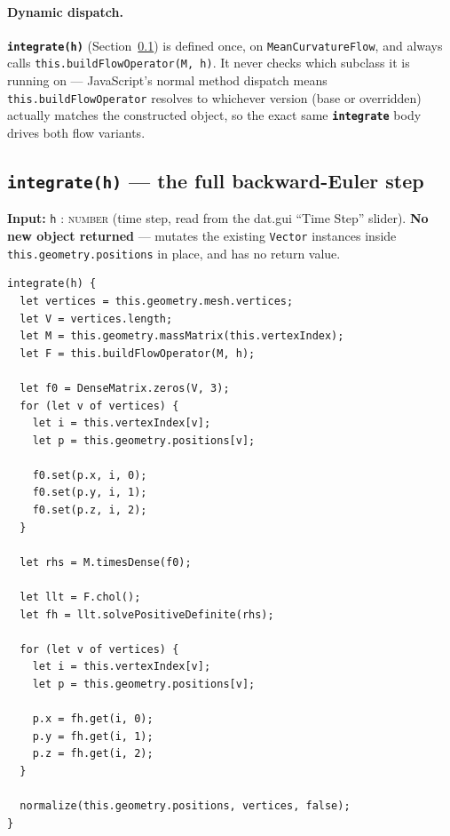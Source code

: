 \documentclass[11pt]{article}
\newcommand{\code}[1]{\texttt{#1}}
\newcommand{\func}[1]{\texttt{\textbf{#1}}}
\newcommand{\type}[1]{\textsc{#1}}
\begin{document}
\paragraph{Dynamic dispatch.} \func{integrate(h)} (Section~\ref{sec:integrate}) is defined
once, on \code{MeanCurvatureFlow}, and always calls \code{this.buildFlowOperator(M, h)}. It
never checks which subclass it is running on --- JavaScript's normal method dispatch means
\code{this.buildFlowOperator} resolves to whichever version (base or overridden) actually
matches the constructed object, so the exact same \func{integrate} body drives both flow
variants.

\subsection{\func{integrate(h)} --- the full backward-Euler step}
\label{sec:integrate}
\textbf{Input:} \code{h} : \type{number} (time step, read from the dat.gui ``Time Step''
slider). \textbf{No new object returned} --- mutates the existing \code{Vector} instances
inside \code{this.geometry.positions} in place, and has no return value.

\begin{lstlisting}
integrate(h) {
  let vertices = this.geometry.mesh.vertices;
  let V = vertices.length;
  let M = this.geometry.massMatrix(this.vertexIndex);
  let F = this.buildFlowOperator(M, h);

  let f0 = DenseMatrix.zeros(V, 3);
  for (let v of vertices) {
    let i = this.vertexIndex[v];
    let p = this.geometry.positions[v];

    f0.set(p.x, i, 0);
    f0.set(p.y, i, 1);
    f0.set(p.z, i, 2);
  }

  let rhs = M.timesDense(f0);

  let llt = F.chol();
  let fh = llt.solvePositiveDefinite(rhs);

  for (let v of vertices) {
    let i = this.vertexIndex[v];
    let p = this.geometry.positions[v];

    p.x = fh.get(i, 0);
    p.y = fh.get(i, 1);
    p.z = fh.get(i, 2);
  }

  normalize(this.geometry.positions, vertices, false);
}
\end{lstlisting}
\end{document}
